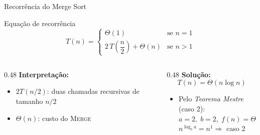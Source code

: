 \documentclass[aspectratio=169]{beamer}
\begin{document}
\begin{frame}{Recorrência do Merge Sort}
  \begin{block}{Equação de recorrência}
    \[
      T(n) = \begin{cases}
        \Theta(1) & \text{se } n = 1 \\
        2\,T\!\left(\dfrac{n}{2}\right) + \Theta(n) & \text{se } n > 1
      \end{cases}
    \]
  \end{block}

  \vspace{8pt}
  \begin{columns}[T]
    \begin{column}{0.48\textwidth}
      \textbf{Interpretação:}
      \begin{itemize}
        \item $2T(n/2)$: duas chamadas recursivas de tamanho $n/2$
        \item $\Theta(n)$: custo do \textsc{Merge}
      \end{itemize}
    \end{column}
    \begin{column}{0.48\textwidth}
      \textbf{Solução:}
      \[
        T(n) = \Theta(n \log n)
      \]
      \begin{itemize}
        \item Pelo \emph{Teorema Mestre} (caso 2):\\
              $a=2,\; b=2,\; f(n)=\Theta(n)$\\
              $n^{\log_b a} = n^1 \Rightarrow$ caso 2
      \end{itemize}
    \end{column}
  \end{columns}
\end{frame}
\end{document}
